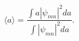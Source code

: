 \begin{equation}
\langle a\rangle=\frac{\int a |\psi_{mn}|^2 da}{\int|\psi_{mn}|^2 da}.
\label{meanvalue}
\end{equation}

